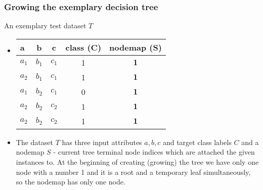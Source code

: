 \documentclass[smaller, proffesionalfonts]{beamer}
\def\bm{\boldsymbol}
\begin{document}
\begin{frame}
\frametitle{Growing the exemplary decision tree}
\begin{block}{An exemplary test dataset $T$}
\begin{itemize}
\item
\begin{center}
{\sf
   \begin{tabular}{|p{3mm}||c|c||c||c|}
   \hline 
   a & b & c & class (C) & nodemap (S)\\
   \hline
   \hline
    $a_1$ & $b_1$ & $c_1$ & 1 & $\bm 1$ \\
   \hline
    $a_2$ & $b_1$ & $c_1$ & 1 & $\bm 1$ \\
   \hline
    $a_1$ & $b_2$ & $c_1$ & 0 & $\bm 1$ \\
   \hline
    $a_2$ & $b_2$ & $c_2$ & 1 & $\bm 1$ \\
   \hline
    $a_2$ & $b_2$ & $c_2$ & 1 & $\bm 1$ \\
   \hline
   \end{tabular}
}
\end{center}
\item
\justifying
The dataset $T$ has three input attributes $a,b,c$ and target class labels $C$ and a nodemap $S$ - current tree terminal node indices which are attached the given instances to.
At the beginning of creating (growing) the tree we have only one node with a number 1 and it is a root and a temporary leaf simultaneously, so the nodemap has only one node.

\begin{center}
\end{center}

\end{itemize}
\end{block}
\end{frame}
\end{document}
